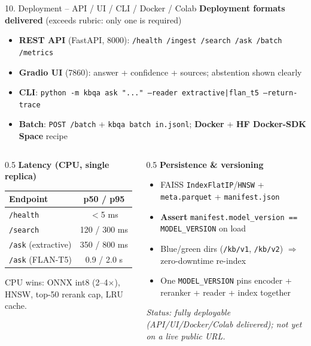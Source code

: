 \documentclass[10pt,aspectratio=169]{beamer}
\begin{document}
\begin{frame}{10. Deployment -- API / UI / CLI / Docker / Colab}
\textbf{Deployment formats delivered} (exceeds rubric: only one is required)
\begin{itemize}\small
  \item \textbf{REST API} (FastAPI, 8000): \texttt{/health /ingest /search /ask /batch /metrics}
  \item \textbf{Gradio UI} (7860): answer + confidence + sources; abstention shown clearly
  \item \textbf{CLI}: \texttt{python -m kbqa ask "..." --reader extractive|flan\_t5 --return-trace}
  \item \textbf{Batch}: \texttt{POST /batch} + \texttt{kbqa batch in.jsonl}; \textbf{Docker} + \textbf{HF Docker-SDK Space} recipe
\end{itemize}

\begin{columns}[T]
\begin{column}{0.5\textwidth}
\textbf{Latency (CPU, single replica)}
\begin{table}[h]
\centering\scriptsize
\begin{tabular}{lc}
\toprule
\textbf{Endpoint} & \textbf{p50 / p95} \\
\midrule
\texttt{/health} & $<$5 ms \\
\texttt{/search} & 120 / 300 ms \\
\texttt{/ask} (extractive) & 350 / 800 ms \\
\texttt{/ask} (FLAN-T5) & 0.9 / 2.0 s \\
\bottomrule
\end{tabular}
\end{table}
\scriptsize CPU wins: ONNX int8 (2--4$\times$), HNSW, top-50 rerank cap, LRU cache.
\end{column}
\begin{column}{0.5\textwidth}
\textbf{Persistence \& versioning}
\begin{itemize}\scriptsize
  \item FAISS \texttt{IndexFlatIP}/\texttt{HNSW} + \texttt{meta.parquet} + \texttt{manifest.json}
  \item \textbf{Assert} \texttt{manifest.model\_version == MODEL\_VERSION} on load
  \item Blue/green dirs (\texttt{/kb/v1}, \texttt{/kb/v2}) $\Rightarrow$ zero-downtime re-index
  \item One \texttt{MODEL\_VERSION} pins encoder + reranker + reader + index together
\end{itemize}
\scriptsize \textit{Status: fully deployable (API/UI/Docker/Colab delivered); not yet on a live public URL.}
\end{column}
\end{columns}
\end{frame}
\end{document}
